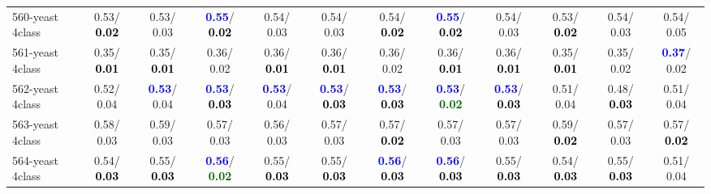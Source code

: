 \begin{table}[h]
\begin{center}
{\begin{tabular}{lc|c|c|c|c|c|c|c|c|c|c}
560-yeast 4class &   0.53/\textcolor{black}{\textbf{  0.02}} &   0.53/  0.03 & \textcolor{blue}{\textbf{  0.55}}/\textcolor{black}{\textbf{  0.02}} &   0.54/  0.03 &   0.54/  0.03 &   0.54/\textcolor{black}{\textbf{  0.02}} & \textcolor{blue}{\textbf{  0.55}}/\textcolor{black}{\textbf{  0.02}} &   0.54/  0.03 &   0.53/\textcolor{black}{\textbf{  0.02}} &   0.54/  0.03 &   0.54/  0.05 \\
561-yeast 4class &   0.35/\textcolor{black}{\textbf{  0.01}} &   0.35/\textcolor{black}{\textbf{  0.01}} &   0.36/  0.02 &   0.36/\textcolor{black}{\textbf{  0.01}} &   0.36/\textcolor{black}{\textbf{  0.01}} &   0.36/  0.02 &   0.36/\textcolor{black}{\textbf{  0.01}} &   0.36/\textcolor{black}{\textbf{  0.01}} &   0.35/\textcolor{black}{\textbf{  0.01}} &   0.35/  0.02 & \textcolor{blue}{\textbf{  0.37}}/  0.02 \\
562-yeast 4class &   0.52/  0.04 & \textcolor{blue}{\textbf{  0.53}}/  0.04 & \textcolor{blue}{\textbf{  0.53}}/\textcolor{black}{\textbf{  0.03}} & \textcolor{blue}{\textbf{  0.53}}/  0.04 & \textcolor{blue}{\textbf{  0.53}}/\textcolor{black}{\textbf{  0.03}} & \textcolor{blue}{\textbf{  0.53}}/\textcolor{black}{\textbf{  0.03}} & \textcolor{blue}{\textbf{  0.53}}/\textcolor{darkgreen}{\textbf{  0.02}} & \textcolor{blue}{\textbf{  0.53}}/\textcolor{black}{\textbf{  0.03}} &   0.51/  0.04 &   0.48/\textcolor{black}{\textbf{  0.03}} &   0.51/  0.04 \\
563-yeast 4class &   0.58/  0.03 &   0.59/  0.03 &   0.57/  0.03 &   0.56/  0.03 &   0.57/  0.03 &   0.57/\textcolor{black}{\textbf{  0.02}} &   0.57/  0.03 &   0.57/  0.03 &   0.59/\textcolor{black}{\textbf{  0.02}} &   0.57/  0.03 &   0.57/\textcolor{black}{\textbf{  0.02}} \\
564-yeast 4class &   0.54/\textcolor{black}{\textbf{  0.03}} &   0.55/\textcolor{black}{\textbf{  0.03}} & \textcolor{blue}{\textbf{  0.56}}/\textcolor{darkgreen}{\textbf{  0.02}} &   0.55/\textcolor{black}{\textbf{  0.03}} &   0.55/\textcolor{black}{\textbf{  0.03}} & \textcolor{blue}{\textbf{  0.56}}/\textcolor{black}{\textbf{  0.03}} & \textcolor{blue}{\textbf{  0.56}}/\textcolor{black}{\textbf{  0.03}} &   0.55/\textcolor{black}{\textbf{  0.03}} &   0.54/\textcolor{black}{\textbf{  0.03}} &   0.55/\textcolor{black}{\textbf{  0.03}} &   0.51/  0.04 \\\end{tabular}}\label{stratsALCKappa17Allalla}
\end{center}
\end{table}
